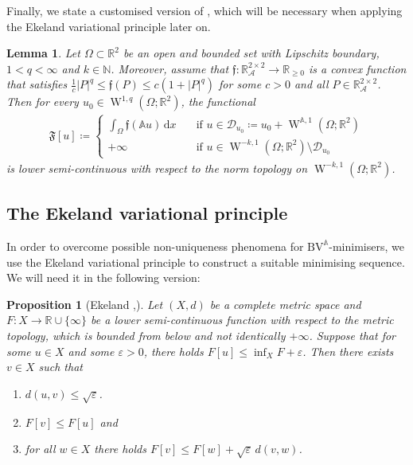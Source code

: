 \documentclass[a4paper,10pt,reqno,oneside]{amsart}
\numberwithin{equation}{section}
\newcommand{\R}{\mathbb R}
\newcommand{\N}{\mathbb N}
\newcommand{\A}{\mathscr{A}}
\newcommand{\Aop}{\mathbb{A}}
\newcommand{\sobo}{\operatorname{W}}
\newcommand{\BV}{\mathrm{BV}}
\newcommand{\dx}[1]{\,\mathrm{d}#1}
\newcommand{\eps}{\varepsilon}
\newcommand{\abs}[1]{\left\lvert#1\right\rvert}
\newtheorem{lem}[thm]{Lemma}
\newtheorem{prop}[thm]{Proposition}
\begin{document}
\pagebreak \noindent Finally, we state a customised version of \cite[Lem. 2.6]{Gmeineder}, which will be necessary when applying the Ekeland variational principle  later on. 
\begin{lem}\label{lem:LowerSemicontinuity}
	Let $\Omega\subset\R^2$ be an open and bounded set with Lipschitz boundary, $1<q<\infty$ and $k\in\N$. Moreover, assume that $\mathfrak{f}\colon\R^{2\times 2}_\A\to \R_{\geq 0}$ is a convex function that satisfies $\tfrac{1}{c} \abs{P}^q \leq \mathfrak{f} (P)\leq c(1+\abs{P}^q)$ for some $c>0$ and all $P\in\R^{2\times 2}_\A$. Then for every $u_0\in\sobo^{1,q}(\Omega;\R^2)$, the functional 
	\begin{align*}
		\mathfrak{F}[u] \coloneqq 
		\begin{cases}
			\displaystyle \int_\Omega \mathfrak{f}(\Aop u) \dx{x}\quad &\mbox{if } u\in \mathscr{D}_{u_0}\coloneqq u_0 + \sobo^{\Aop,1}(\Omega;\R^2)\\
			+\infty\quad &\mbox{if } u\in\sobo^{-k,1}(\Omega;\R^2)\setminus \mathscr{D}_{u_0}
		\end{cases}
	\end{align*}
is lower semi-continuous with respect to the norm topology on $\sobo^{-k,1}(\Omega;\R^2)$. 
\end{lem}
\subsection{The Ekeland variational principle}

In order to overcome possible non-uniqueness phenomena for $\BV^\Aop$-minimisers, we use the Ekeland variational principle to construct a suitable minimising sequence. We will need it in the following version:

\begin{prop}[Ekeland {\cite{Ekeland}},{\cite[Thm. 5.6, Rem. 5.5]{Giusti}}] \label{prop:Ekeland}
	Let $(X,d)$ be a complete metric space and  $F:X\to \R\cup\{\infty\}$ be a lower semi-continuous function with respect to the metric topology, which is bounded from below and not identically $+\infty$. Suppose that for some $u\in X$ and some $\eps>0$, there holds $F[u]\leq \inf_X F +\eps$. Then there exists $v\in X$ such that 
	\begin{enumerate}
		\item $d(u,v) \leq \sqrt{\eps}$. 
		\item $F[v] \leq F[u]$ and 
		\item for all $w\in X$ there holds $F[v]\leq F[w]+\sqrt{\eps}\, d(v,w)$. 
	\end{enumerate}
\end{prop}
\end{document}
